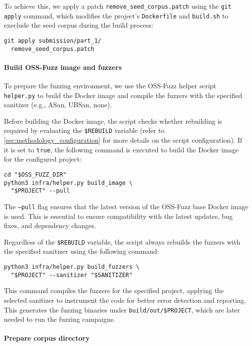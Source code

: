 \documentclass[11pt,a4paper,twocolumn]{article}
\begin{document}
To achieve this, we apply a patch \texttt{remove\_seed\_corpus.patch} using the \texttt{git apply} command, which modifies the project's \texttt{Dockerfile} and \texttt{build.sh} to execlude the seed corpus during the build process:

\begin{verbatim}
git apply submission/part_1/
  remove_seed_corpus.patch
\end{verbatim}

\noindent \paragraph{Build OSS-Fuzz image and fuzzers} To prepare the fuzzing environment, we use the OSS-Fuzz helper script \texttt{helper.py} to build the Docker image and compile the fuzzers with the specified sanitizer (e.g., ASan, UBSan, none).

Before building the Docker image, the script checks whether rebuilding is required by evaluating the \texttt{\$REBUILD} variable (refer to \autoref{sec:methodology_configuration} for more details on the script configuration). If it is set to \texttt{true}, the following command is executed to build the Docker image for the configured project:

\begin{verbatim}
cd "$OSS_FUZZ_DIR"
python3 infra/helper.py build_image \
  "$PROJECT" --pull
\end{verbatim}

The \texttt{---pull} flag ensures that the latest version of the OSS-Fuzz base Docker image is used. This is essential to ensure compatibility with the latest updates, bug fixes, and dependency changes.

Regardless of the \texttt{\$REBUILD} variable, the script always rebuilds the fuzzers with the specified sanitizer using the following command:

\begin{verbatim}
python3 infra/helper.py build_fuzzers \
  "$PROJECT" --sanitizer "$SANITIZER" 
\end{verbatim}

This command compiles the fuzzers for the specified project, applying the selected sanitizer to instrument the code for better error detection and reporting. This generates the fuzzing binaries under \texttt{build/out/\$PROJECT}, which are later needed to run the fuzzing campaigns.

\noindent \paragraph{Prepare corpus directory}
\end{document}
